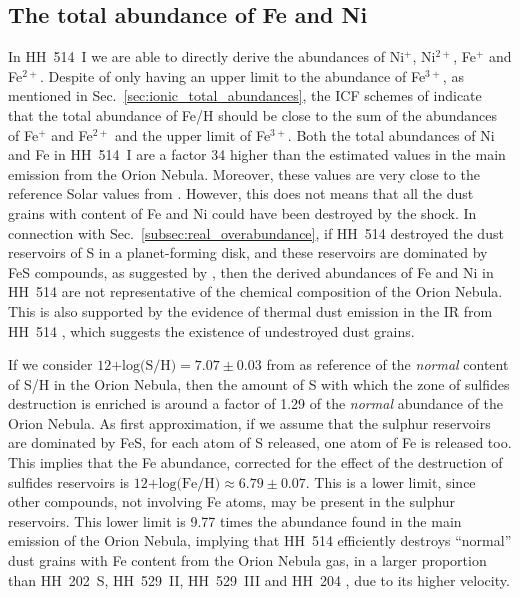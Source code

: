 \documentclass[fleqn,usenatbib]{mnras}
\begin{document}
\subsection{The total abundance of Fe and Ni}
\label{subsec:totalFeandNi}

In HH~514~I we are able to directly derive the abundances of Ni$^{+}$, Ni$^{2+}$, Fe$^{+}$ and Fe$^{2+}$. Despite of only having an upper limit to the abundance of Fe$^{3+}$, as mentioned in Sec.~\ref{sec:ionic_total_abundances}, the ICF schemes of \citet{rodriguez05} indicate that the total abundance of Fe/H should be close to the sum of the abundances of Fe$^{+}$ and Fe$^{2+}$ and the upper limit of Fe$^{3+}$. Both the total abundances of Ni and Fe in HH~514~I are a factor 34 higher than the estimated values in the main emission from the Orion Nebula. Moreover, these values are very close to the reference Solar values from \citet{lodders19}. However, this does not means that all the dust grains with content of Fe and Ni could have been destroyed by the shock. In connection with Sec.~\ref{subsec:real_overabundance}, if HH~514 destroyed the dust reservoirs of S in a planet-forming disk, and these reservoirs are dominated by FeS compounds, as suggested by \citet{Kama19}, then the derived abundances of Fe and Ni in HH~514 are not representative of the chemical composition of the Orion Nebula. This is also supported by the evidence of thermal dust emission in the IR from HH~514 \citep{smith05}, which suggests the existence of undestroyed dust grains.

If we consider $\text{12+log(S/H)}=7.07 \pm 0.03$ from \citet{mendez2021-2} as reference of the \textit{normal} content of S/H in the Orion Nebula, then the amount of S with which the zone of sulfides destruction is enriched is around a factor of 1.29 of the \textit{normal} abundance of the Orion Nebula. As first approximation, if we assume that the sulphur reservoirs are dominated by FeS, for each atom of S released, one atom of Fe is released too. This implies that the Fe abundance, corrected for the effect of the destruction of sulfides reservoirs is $\text{12+log(Fe/H)}\approx6.79 \pm 0.07$. This is a lower limit, since other compounds, not involving Fe atoms, may be present in the sulphur reservoirs. This lower limit is 9.77 times the abundance found in the main emission of the Orion Nebula, implying that HH~514 efficiently destroys ``normal'' dust grains with Fe content from the Orion Nebula gas, in a larger proportion than  HH~202~S, HH~529~II, HH~529~III and HH~204 \citep[][]{mesadelgado09,mendez2021,mendez2021-2}, due to its higher velocity.
\end{document}
